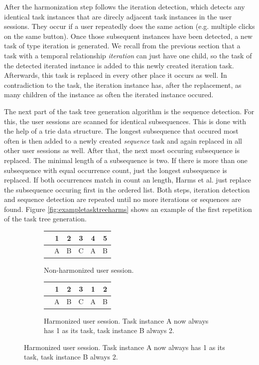 After the harmonization step follows the iteration detection, which detects any identical task instances that are direcly adjacent task instances in the user sessions. They occur if a user repeatedly does the same action (e.g. multiple clicks on the same button).
Once those subsequent instances have been detected, a new task of type iteration is generated.
We recall from the previous section that a task with a temporal relationship \textit{iteration} can just have one child, so the task of the detected iterated instance is added to this newly created iteration task.
Afterwards, this task is replaced in every other place it occurs as well.
In contradiction to the task, the iteration instance has, after the replacement, as many children of the instance as often the iterated instance occured.

The next part of the task tree generation algorithm is the sequence detection.
For this, the user sessions are scanned for identical subsequences. This is done with the help of a trie data structure.
The longest subsequence that occured most often is then added to a newly created \textit{sequence} task and again replaced in
all other user sessions as well. After that, the next most occuring subsequence is replaced. The minimal length of a subsequence is two.
If there is more than one subsequence with equal occurrence count, just the longest subsequence is replaced.
If both occurrences match in count an length, Harms et al. just replace the subsequence occuring first in the ordered list.
Both steps, iteration detection and sequence detection are repeated until no more iterations or sequences are found.
Figure \ref{fig:exampletasktreeharms} shows an example of the first repetition of the task tree generation.

\begin{figure}[h!]
	\centering
\begin{subfigure}[hbt]{0.49\textwidth}
\begin{tabular}{r|ccccc}
	\text{Task} & 1 & 2 & 3 & 4 & 5\\
	\hline
	\text{Task instance} & A & B & C & A & B\\
\end{tabular}

\caption{Non-harmonized user session.}
\label{fig:nonharmonized}
\end{subfigure}
\begin{subfigure}[hbt]{0.49\textwidth}
\begin{tabular}{r|ccccc}
	\text{Task} & 1 & 2 & 3 & \textbf{1} & \textbf{2}\\
	\hline
	\text{Task instance} & A & B & C & A & B\\
\end{tabular}
\caption{Harmonized user session. Task instance A now always has 1 as its task, task instance B always 2.}
\label{fig:harmonized}
\end{subfigure}
\end{figure}


